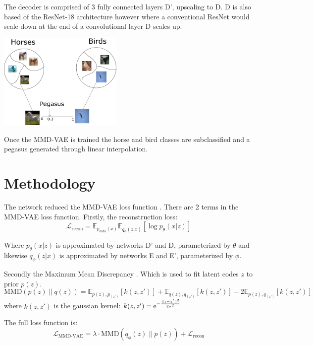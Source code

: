 \documentclass{article}
\begin{document}
The decoder is comprised of 3 fully connected layers D', upscaling to D. D is also based of the ResNet-18 architecture however where a conventional ResNet would scale down at the end of a convolutional layer D scales up.



\begin{center}
    \includegraphics[width=0.45\textwidth]{figures/clustering.png}
\end{center}

Once the MMD-VAE is trained the horse and bird classes are subclassified and a pegasus generated through linear interpolation.

\section{Methodology}
The network reduced the MMD-VAE loss function \cite{infovae}. 
There are 2 terms in the MMD-VAE loss function. Firstly, the reconstruction loss:
\begin{equation}
    \mathcal{L}_{\textrm{recon}} = \mathbb{E}_{p_{\textrm{data}}(x)} \mathbb{E}_{q_\phi (z|x)} [\log p_\theta(x|z)]
\end{equation}

Where $p_\theta(x|z)$ is approximated by networks D' and D, parameterized by $\theta$ and likewise $q_\phi(z|x)$ is approximated by networks E and E', parameterized by $\phi$.


Secondly the Maximum Mean Discrepancy \cite{mmd}. Which is used to fit latent codes $z$ to prior $p(z)$.
\begin{equation}
    \textrm{MMD}(p(z) \lVert q(z)) = \mathbb{E}_{p(z), p_(z')}[k(z, z')] + \mathbb{E}_{q(z), q_(z')}[k(z, z')] - 2 \mathbb{E}_{p(z), q_(z')}[k(z, z')]
\end{equation}
where $k(z, z')$ is the gaussian kernel: $k(z, z')={\rm e}^{-\frac{\lVert z-z' \rVert^2}{2\sigma^2}}$

The full loss function is:
\begin{equation}
    \mathcal{L}_\textrm{MMD-VAE} = \lambda \cdot \textrm{MMD}(q_\phi (z) \lVert p(z)) + \mathcal{L}_{\textrm{recon}}
\end{equation}
\end{document}
